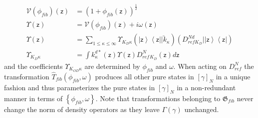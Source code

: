 \documentclass[aps,preprint]{revtex4}%
\begin{document}
\begin{align}
\mathcal{V}\left(  \phi_{fib}\right)  \left(  \mathsf{z}\right)   &  =\left(
1+\phi_{fib}\left(  \mathsf{z}\right)  \right)  ^{\frac{1}{2}}\nonumber\\
\Upsilon\left(  \mathsf{z}\right)   &  =\mathcal{V}\left(  \phi_{fib}\right)
\left(  \mathsf{z}\right)  +i\omega\left(  \mathsf{z}\right) \nonumber\\
\Upsilon\left(  \mathsf{z}\right)   &  =\sum_{1\leq\kappa\leq\infty}%
\Upsilon_{K_{D}\kappa}\left(  \left|  \mathsf{z}\right\rangle \left\langle
\mathsf{z}\right|  |\breve{k}_{\kappa}\right)  \left(  D_{refK_{D}}%
^{Nd}|\left|  \mathsf{z}\right\rangle \left\langle \mathsf{z}\right|  \right)
\nonumber\\
\Upsilon_{K_{D}\kappa}  &  =\int k_{\kappa}^{d\ast}\left(  \mathsf{z}\right)
\Upsilon\left(  \mathsf{z}\right)  D_{ref}^{N}{}_{K_{D}}\left(  \mathsf{z}%
\right)  d\mathsf{z}%
\end{align}
and the coefficients $\Upsilon_{K_{OD}\kappa}$ are determined by $\phi_{fib}$
and $\omega$. When acting on $D_{ref}^{N}$ the transformation $\hat{T}%
_{fib}\left(  \phi_{fib},\omega\right)  $ produces all other pure states in
$\left[  \gamma\right]  _{N}$ in a unique fashion and thus parameterizes the
pure states in $\left[  \gamma\right]  _{N}$ in a non-redundant manner in
terms of $\left\{  \phi_{fib},\omega\right\}  $. Note that transformations
belonging to $\mathfrak{G}_{fib}$ never change the norm of density operators
as they leave $\Gamma\left(  \gamma\right)  $ unchanged.
\end{document}
